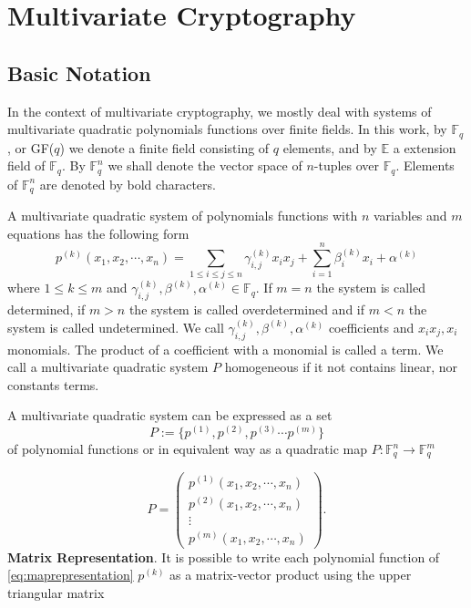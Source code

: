 \chapter{{Multivariate Cryptography}}

\section{Basic Notation}
In the context of multivariate cryptography, we mostly deal with systems of multivariate quadratic polynomials functions over finite fields. In this work, by $\mathbb{F}_q$, or GF($q$) we denote a finite field consisting of $q$ elements, and by $\mathbb{E}$ a extension field of $\mathbb{F}_q$. By $\mathbb{F}_q^n$ we shall denote the vector space of $n$-tuples over $\mathbb{F}_q$. Elements of $\mathbb{F}_q^n$ are denoted by bold characters.

A multivariate quadratic system of polynomials functions with $n$ variables and $m$ equations has the following form
\begin{equation}
p^{(k)}(x_1,x_2,\cdots,x_n) = \sum_{1\leq i \leq j \leq n}\gamma_{i,j}^{(k)} x_i x_j + \sum_{i=1}^{n}\beta^{(k)}_i x_i + \alpha^{(k)}
\label{eq:1}
\end{equation}
where $1\leq k\leq m$ and $\gamma_{i,j}^{(k)}, \beta^{(k)}, \alpha^{(k)} \in \mathbb{F}_q$. If $m=n$ the system is called determined, if $m>n$ the system is called overdetermined and if $m<n$ the system is called undetermined. We call $\gamma_{i,j}^{(k)}, \beta^{(k)}, \alpha^{(k)}$ coefficients and $x_ix_j, x_i$ monomials. The product of a coefficient with  a monomial is called a term. We call a multivariate quadratic system $P$ homogeneous if it not contains linear, nor constants terms.

A multivariate quadratic system can be expressed as a set 
\[
P:=\{p^{(1)}, p^{(2)}, p^{(3)}\cdots p^{(m)}\}
\] 
of polynomial functions or in equivalent way as a quadratic map $P\colon \mathbb{F}_q^n \rightarrow \mathbb{F}_q^m$

\begin{equation}
 P=\left(\begin{matrix}
    p^{(1)}(x_1,x_2,\cdots,x_n)  \\
    p^{(2)}(x_1,x_2,\cdots,x_n) \\
    \vdots \\
    p^{(m)} (x_1,x_2,\cdots,x_n) 
   \end{matrix}\right).
\label{eq:maprepresentation}
\end{equation}
\noindent
\textbf{Matrix Representation}.
It is possible to write each polynomial function of \eqref{eq:maprepresentation} $p^{(k)}$ as a matrix-vector product using the upper triangular matrix 

